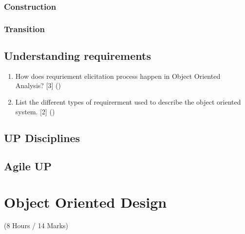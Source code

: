 \documentclass[12pt]{article}
\begin{document}
    \subsubsection{Construction}
    \subsubsection{Transition}
  \subsection{Understanding requirements}
    \begin{enumerate}
      \item How does requriement elicitation process happen in Object Oriented Analysis? \hfill [3] ()

      \item List the different types of requirerment used to describe the object oriented system. \hfill [2] ()
    \end{enumerate}
  \subsection{UP Disciplines}
  \subsection{Agile UP}

\pagebreak

\section{Object Oriented Design}
  \begin{center} (8 Hours / 14 Marks) \end{center}
\end{document}
